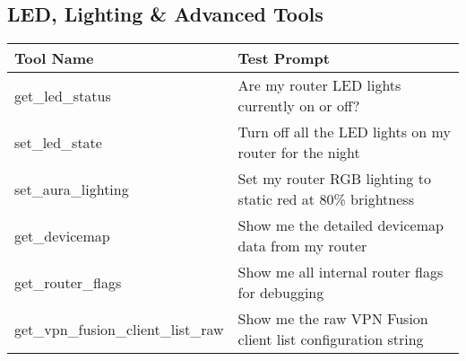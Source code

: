 {\subsection*{LED, Lighting \& Advanced Tools}
\begin{tabular}{|p{6cm}|p{9cm}|}
\hline
\textbf{Tool Name} & \textbf{Test Prompt} \\
\hline
get\_led\_status & Are my router LED lights currently on or off? \\
\hline
set\_led\_state & Turn off all the LED lights on my router for the night \\
\hline
set\_aura\_lighting & Set my router RGB lighting to static red at 80\% brightness \\
\hline
get\_devicemap & Show me the detailed devicemap data from my router \\
\hline
get\_router\_flags & Show me all internal router flags for debugging \\
\hline
get\_vpn\_fusion\_client\_list\_raw & Show me the raw VPN Fusion client list configuration string \\
\hline
\end{tabular}
}
